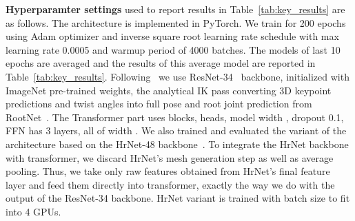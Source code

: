 \documentclass[sigconf,final]{acmart}
\begin{document}
\textbf{Hyperparamter settings} used to report results in Table~\ref{tab:key_results} are as follows. The architecture is implemented in PyTorch. We train for 200 epochs using Adam optimizer and inverse square root learning rate schedule with max learning rate 0.0005 and warmup period of 4000 batches. The models of last 10 epochs are averaged and the results of this average model are reported in Table~\ref{tab:key_results}. Following~\cite{li2021hybrik} we use ResNet-34~\cite{resnet} backbone, initialized with ImageNet pre-trained weights, the analytical IK pass converting 3D keypoint predictions and twist angles into full pose and root joint prediction from RootNet~\cite{moon}. The Transformer part uses  blocks,  heads, model width , dropout 0.1, FFN has 3 layers, all of width . We also trained and evaluated the variant of the architecture based on the HrNet-48 backbone~\cite{sun2019deep}. To integrate the HrNet backbone with transformer, we discard HrNet's mesh generation step as well as average pooling. Thus, we take only  raw features obtained from HrNet's final feature layer and feed them directly into transformer, exactly the way we do with the output of the ResNet-34 backbone. HrNet variant is trained with batch size  to fit into 4 GPUs.



\end{document}
